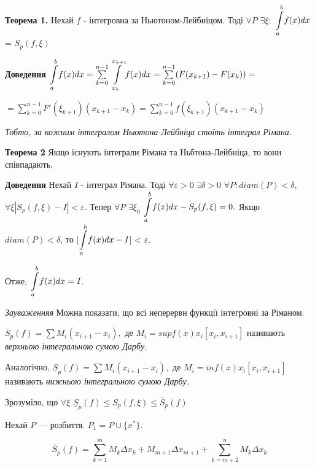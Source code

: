 \documentclass[12pt]{report}
\begin{document}
\textbf{Теорема 1.} Нехай  $ f $ - інтегровна за Ньютоном-Лейбніцом. Тоді $ \forall P  $
$ \exists \xi : $ $\mathlarger\int\limits_ a^b f(x)dx$ = $ S_p (f, \xi) $

\textbf{Доведення} $\mathlarger\int\limits_ a^b f(x)dx =  \sum\limits_{k=0}^{n-1}\mathlarger\int\limits_{x_k}^{x_{k+1}} f(x)dx = \sum\limits_{k=0}^{n-1}(F(x_{k+1}) - F(x_k)) =$

$=  \sum\limits_{k=0}^{n-1} F'(\xi_{k+1}) (x_{k+1} - x_k) = \sum\limits_{k=0}^{n-1} f(\xi_{k+1})(x_{k+1} - x_k)$

\vspace{5 mm} 
\textit{Тобто, за кожним інтегралом Ньютона-Лейбніца стоїть інтеграл Рімана.}

\vspace{5 mm} 

\textbf{Теорема 2} Якщо існують інтеграли Рімана та Ньбтона-Лейбніца, то вони співпадають.

\textbf{Доведення} Нехай $ I $ - інтеграл Рімана. Тоді $ \forall \varepsilon > 0 $  $\exists \delta > 0  $ $ \forall P: diam (P)  < \delta , $  $ \forall \xi |S_p(f, \xi) - I| < \varepsilon.$ Тепер 
$ \forall P$ $ \exists \xi_0  $ $ \mathlarger\int\limits_a^b f(x) dx - S_p (f, \xi) = 0.$
 Якщо $ diam(P)< \delta $, то |$\mathlarger\int\limits_a^b f(x) dx  - I  $| < $ \varepsilon. $
 
Отже, $\mathlarger\int\limits_a^b f(x) dx   = I$.

\vspace{5 mm} 
\textit{Зауваженняя} Можна показати, що всі неперервн функції інтегровні за Ріманом.

\vspace{5 mm} 

$ \overline S_p(f) = \sum M_i (x_{i+1} - x_{i}) ,$ де $ M_i = supf(x)  x_i [x_i, x_{i+1}]$
називають \textit{верхньою інтегральною сумою Дарбу.}

Аналогічно, $ \underline S_p(f) = \sum M_i (x_{i+1} - x_{i}) ,$ де $ M_i = inf(x)  x_i [x_i, x_{i+1}]$ називають \textit{нижньою інтегральною сумою Дарбу.}

\vspace{3 mm} 
Зрозуміло, що $ \forall \xi  $ $ \underline S_p(f) \leq S_p (f, \xi) \leq  \overline S_p(f)$


\vspace{5 mm}

Нехай $P$ --- розбиття. $P_1 = P \cup \{ x^{*}\}$.

$$\overline S_p(f) = \sum_{k = 1}^m M_{k} \Delta x_k + M_{m+1}\Delta x_{m+1} + \sum_{k = m+2}^n M_k \Delta x_k$$
\end{document}
